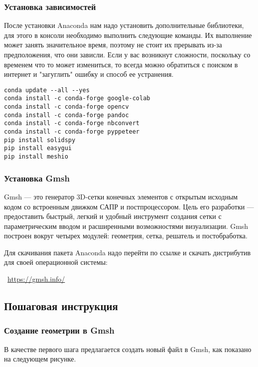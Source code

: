 \documentclass[11pt]{article}
\begin{document}
\subsubsection{Установка зависимостей}
После установки Anaconda нам надо установить дополнительные библиотеки, для этого в консоли необходимо выполнить следующие команды. Их выполнение может занять значительное время, поэтому не стоит их прерывать из-за предположения, что они зависли. Если у вас возникнут сложности, поскольку со временем что то может измениться, то всегда можно обратиться с поиском в интернет и "загуглить" ошибку и способ ее устранения.

    \begin{Verbatim}[commandchars=\\\{\}]
conda update --all --yes
conda install -c conda-forge google-colab
conda install -c conda-forge opencv
conda install -c conda-forge pandoc
conda install -c conda-forge nbconvert
conda install -c conda-forge pyppeteer
pip install solidspy
pip install easygui
pip install meshio
    \end{Verbatim}

\subsubsection{Установка Gmsh}
Gmsh — это генератор 3D-сетки конечных элементов с открытым исходным кодом со встроенным движком САПР и постпроцессором. Цель его разработки — предоставить быстрый, легкий и удобный инструмент создания сетки с параметрическим вводом и расширенными возможностями визуализации. Gmsh построен вокруг четырех модулей: геометрия, сетка, решатель и постобработка. 

Для скачивания пакета Anaconda надо перейти по ссылке и скачать дистрибутив для своей операционной системы:

~\url{https://gmsh.info/}

\subsection{Пошаговая инструкция}
    \subsubsection{Создание геометрии в Gmsh}
    В качестве первого шага предлагается создать новый файл в Gmsh, как показано на следующем рисунке.

    \begin{center}
    \end{center}
    
\end{document}
